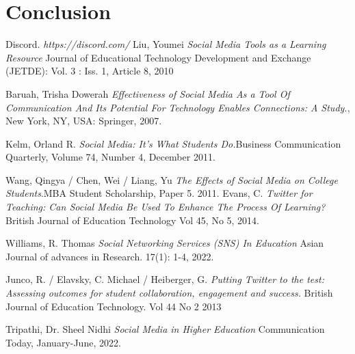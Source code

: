 \documentclass[lettersize,journal]{IEEEtran}
\begin{document}
\section{Conclusion}







\begin{thebibliography}{}

        Discord. {\it{https://discord.com/}}
        Liu, Youmei {\it{Social Media Tools as a Learning Resource}} Journal of Educational Technology Development and Exchange (JETDE): Vol. 3 : Iss. 1, Article 8, 2010

    Baruah, Trisha Dowerah {\it{Effectiveness of Social Media As a Tool Of Communication And Its Potential For Technology Enables Connections: A Study.}}, New York, NY, USA: Springer, 2007.

    Kelm, Orland R. {\it{Social Media: It's What Students Do.}}Business Communication Quarterly, Volume 74, Number 4, December 2011.

        Wang, Qingya / Chen, Wei / Liang, Yu {\it{The Effects of Social Media on College Students}}.MBA Student Scholarship, Paper 5. 2011.
        Evans, C. {\it{Twitter for Teaching: Can Social Media Be Used To Enhance The Process Of Learning?}} British Journal of Education Technology
Vol 45, No 5, 2014.

        Williams, R. Thomas {\it{Social Networking Services (SNS) In Education}}
        Asian Journal of advances in Research. 17(1): 1-4, 2022.

        Junco, R. / Elavsky, C. Michael / Heiberger, G. {\it{Putting Twitter to
        the test: Assessing outcomes for student collaboration, engagement and
        success.}} British Journal of Education Technology. Vol 44 No 2 2013

        Tripathi, Dr. Sheel Nidhi {\it{Social Media in Higher Education}}
        Communication Today, January-June, 2022.


\end{thebibliography}
\end{document}
